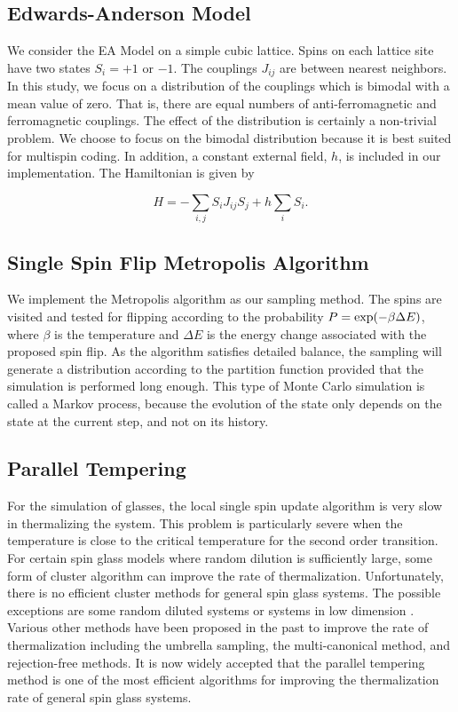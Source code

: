 \subsection{Edwards-Anderson Model}

We consider the EA Model \cite{Edwards-Anderson1975} on a 
simple cubic lattice. Spins on each lattice site have two states 
$S_i=+1$ or $-1$. The couplings $J_{ij}$ are between nearest neighbors. In this 
study, we focus on a distribution of the couplings which is bimodal with a mean 
value of zero. That is, there are equal numbers of anti-ferromagnetic and ferromagnetic 
couplings. The effect of the distribution is certainly a non-trivial problem. 
We choose to focus on the bimodal distribution  because it is best suited for multispin coding. 
In addition, a constant external field, $h$, is included in our implementation. 
The Hamiltonian is given by 

\begin{equation}
H = - \sum_{i,j} S_i J_{ij} S_j + h \sum_{i} S_i.
\end{equation}


\subsection{Single Spin Flip Metropolis Algorithm}

We implement the Metropolis algorithm as our sampling method. The spins are 
visited and tested for flipping according to the probability $P = \mathrm{exp}(-\beta\Delta E)$,
where $\beta$ is the temperature and $\Delta E$ is the energy change associated 
with the proposed spin flip. As the algorithm satisfies detailed balance, the sampling 
will generate a distribution according to the partition function provided that the 
simulation is performed long enough.  This type of Monte Carlo simulation is
called a Markov process, because the evolution of the state only depends on the state 
at the current step, and not on its history. 

\subsection{Parallel Tempering}

For the simulation of glasses, the local single spin 
update algorithm is very slow in thermalizing the system. This problem is particularly 
severe when the temperature is close to the critical temperature for the second order 
transition. For certain spin glass models where random dilution is sufficiently 
large, some form of cluster algorithm can improve the rate of thermalization. Unfortunately, 
there is no efficient cluster methods for general spin glass systems. The possible exceptions are 
some random diluted systems or systems in low dimension \cite{Houdayer-2001,Liang-1992,Jorg-2005}. Various other methods have been proposed 
in the past to improve the rate of thermalization including the umbrella sampling, 
the multi-canonical method, and rejection-free methods. It is now widely accepted that 
the parallel tempering method is one of the most efficient algorithms for improving 
the thermalization rate of general spin glass systems.

